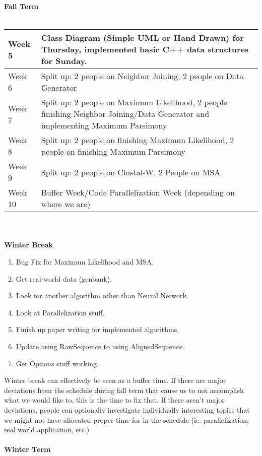 \documentclass[10pt]{article}
\begin{document}
\noindent \textbf{Fall Term}\\\\
\noindent
{}
\begin{tabular}{ | l | p{10cm} |}
\hline
Week 5 & Class Diagram (Simple UML or Hand Drawn) for Thursday, implemented
basic C++ data structures for Sunday.\\ 
\hline
Week 6 & Split up: 2 people on Neighbor Joining, 2 people on Data Generator\\
\hline
Week 7 & Split up: 2 people on Maximum Likelihood, 2 people finishing Neighbor
Joining/Data Generator and implementing Maximum Parsimony\\
\hline
Week 8 & Split up: 2 people on finishing Maximum Likelihood, 2 people on finishing
Maximum Parsimony\\
\hline
Week 9 & Split up: 2 people on Clustal-W, 2 People on MSA\\
\hline
Week 10 & Buffer Week/Code Parallelization Week (depending on where
we are)\\
\hline
\end{tabular}
\\\\
\noindent \textbf{Winter Break}\\
\begin{enumerate}
  \item
    Bug Fix for Maximum Likelihood and MSA.
  \item
    Get real-world data (genbank).
  \item
    Look for another algorithm other than Neural Network.
  \item
    Look at Parallelization stuff.
  \item
    Finish up paper writing for implemented algorithms.
  \item
    Update using RawSequence to using AlignedSequence.
  \item
    Get Options stuff working.
\end{enumerate}
Winter break can effectively be seen as a buffer time. If there are major
deviations from the schedule during fall term that cause us to not
accomplish what we would like to, this is the time to fix that. If there
aren't major deviations, people can optionally investigate individually
interesting topics that we might not have allocated proper time for
in the schedule (ie. parallelization, real world application, etc.)
\\\\
\noindent \textbf{Winter Term}\\\\
\end{document}
